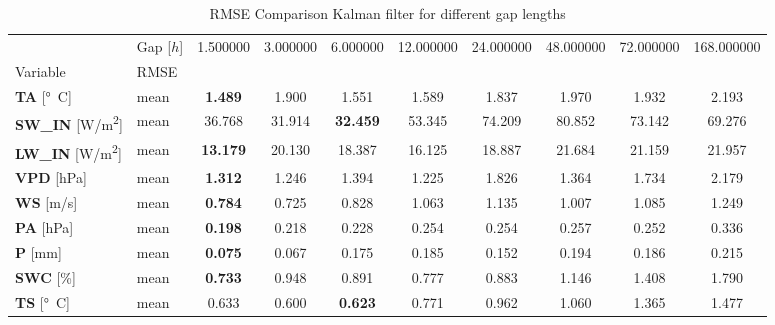 \begin{table}
\centering
\caption{RMSE Comparison Kalman filter for different gap lengths}
\label{gap_len}
\begin{tabular}{p{2.1cm}l|cccccccc}
\toprule
 & Gap [$h$] & 1.500000 & 3.000000 & 6.000000 & 12.000000 & 24.000000 & 48.000000 & 72.000000 & 168.000000 \\
Variable & RMSE &  &  &  &  &  &  &  &  \\
\midrule
\parbox{2.1cm}{\textbf{TA} [\si{°C}]} & mean & \bfseries 1.489 & 1.900 & 1.551 & 1.589 & 1.837 & 1.970 & 1.932 & 2.193 \\
\parbox{2.1cm}{\textbf{SW\_IN} [\si{W/m^2}]} & mean & 36.768 & 31.914 & \bfseries 32.459 & 53.345 & 74.209 & 80.852 & 73.142 & 69.276 \\
\parbox{2.1cm}{\textbf{LW\_IN} [\si{W/m^2}]} & mean & \bfseries 13.179 & 20.130 & 18.387 & 16.125 & 18.887 & 21.684 & 21.159 & 21.957 \\
\parbox{2.1cm}{\textbf{VPD} [\si{hPa}]} & mean & \bfseries 1.312 & 1.246 & 1.394 & 1.225 & 1.826 & 1.364 & 1.734 & 2.179 \\
\parbox{2.1cm}{\textbf{WS} [\si{m/s}]} & mean & \bfseries 0.784 & 0.725 & 0.828 & 1.063 & 1.135 & 1.007 & 1.085 & 1.249 \\
\parbox{2.1cm}{\textbf{PA} [\si{hPa}]} & mean & \bfseries 0.198 & 0.218 & 0.228 & 0.254 & 0.254 & 0.257 & 0.252 & 0.336 \\
\parbox{2.1cm}{\textbf{P} [\si{mm}]} & mean & \bfseries 0.075 & 0.067 & 0.175 & 0.185 & 0.152 & 0.194 & 0.186 & 0.215 \\
\parbox{2.1cm}{\textbf{SWC} [\si{\%}]} & mean & \bfseries 0.733 & 0.948 & 0.891 & 0.777 & 0.883 & 1.146 & 1.408 & 1.790 \\
\parbox{2.1cm}{\textbf{TS} [\si{°C}]} & mean & 0.633 & 0.600 & \bfseries 0.623 & 0.771 & 0.962 & 1.060 & 1.365 & 1.477 \\
\bottomrule
\end{tabular}
\end{table}
